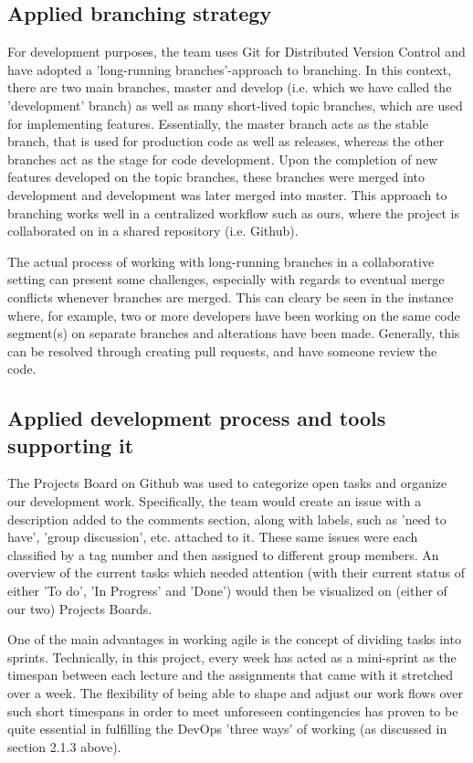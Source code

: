 \subsection{Applied branching strategy}
For development purposes, the team uses Git for Distributed Version Control and have adopted a 'long-running branches'-approach to branching. \cite{lecture02}
In this context, there are two main branches, master and develop (i.e. which we have called the 'development' branch) as well as many short-lived topic branches, 
which are used for implementing features. 
Essentially, the master branch acts as the stable branch, that is used for production code as well as releases, whereas the other branches act as the stage for code development. 
Upon the completion of new features developed on the topic branches, these branches were merged into development and development was later merged into master. 
This approach to branching works well in a centralized workflow such as ours, where the project is collaborated on in a shared repository (i.e. Github).

The actual process of working with long-running branches in a collaborative setting can present some challenges, especially with regards to eventual merge conflicts whenever branches are merged. 
This can cleary be seen in the instance where, for example, two or more developers have been working on the same code segment(s) on separate branches and alterations have been made. 
Generally, this can be resolved through creating pull requests, and have someone review the code.

\subsection{Applied development process and tools supporting it}
The Projects Board on Github was used to categorize open tasks and organize our development work. Specifically, the team would create an issue with a description added to the comments section, along with labels, such as 'need to have', 'group discussion', etc. attached to it. These same issues were each classified by a tag number and then assigned to different group members. An overview of the current tasks which needed attention (with their current status of either 'To do', 'In Progress' and 'Done') would then be visualized on (either of our two) Projects Boards.

One of the main advantages in working agile is the concept of dividing tasks into sprints. 
Technically, in this project, every week has acted as a mini-sprint as the timespan between each lecture and the assignments that came with it stretched over a week. 
The flexibility of being able to shape and adjust our work flows over such short timespans in order to meet unforeseen contingencies has proven to be quite essential in fulfilling the DevOps 'three ways' of working (as discussed in section 2.1.3 above).  

